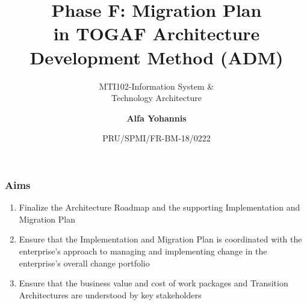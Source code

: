 \documentclass[aspectratio=169, table]{beamer}
\subtitle{MTI102-Information System \&\\Technology Architecture}
\title{\vskip-0.7cm \Large Phase F: Migration Plan\\in TOGAF
	Architecture\\Development Method (ADM)}
\date[Serial]{\scriptsize {PRU/SPMI/FR-BM-18/0222}}
\author[Pradita]{\small {\textbf{Alfa Yohannis}}}
\begin{document}
	
	\frame{\titlepage}
	
	\begin{frame}
		\frametitle{Aims}
		\begin{enumerate}
			\item Finalize the Architecture Roadmap and the supporting Implementation and Migration Plan
			\item Ensure that the Implementation and Migration Plan is coordinated with the enterprise’s approach to managing and implementing change in the enterprise’s overall change portfolio
			\item Ensure that the business value and cost of work packages and Transition Architectures are understood by key stakeholders
		\end{enumerate}		
	\end{frame}
	
\end{document}
